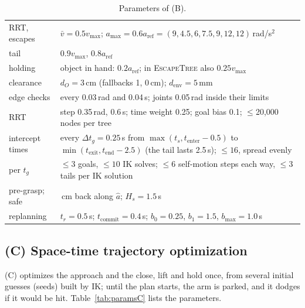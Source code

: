 \documentclass[conference]{IEEEtran}
\begin{document}
\begin{table}[!t]
  \centering
  \caption{Parameters of (B).}
  \label{tab:paramsB}
  \footnotesize\setlength{\tabcolsep}{3pt}
  \begin{tabular}{@{}>{\raggedright\arraybackslash}p{}>{\raggedright\arraybackslash}p{}@{}}
    \toprule
    RRT, escapes & $\bar v=0.5v_{\max}$; $a_{\max}=0.6a_{\text{ref}}=(9,4.5,6,7.5,9,12,12)$\,rad/s$^2$ \\
    tail & $0.9v_{\max}$, $0.8a_{\text{ref}}$ \\
    holding & object in hand: $0.2a_{\text{ref}}$; in \textsc{EscapeTree} also $0.25v_{\max}$ \\
    clearance & $d_O=3$\,cm (fallbacks 1, 0\,cm); $d_{\text{env}}=5$\,mm \\
    edge checks & every 0.03\,rad and 0.04\,s; joints 0.05\,rad inside their limits \\
    RRT & step 0.35\,rad, 0.6\,s; time weight 0.25; goal bias 0.1; $\le$20{,}000 nodes per tree \\
    intercept times & every $\Delta t_g=0.25$\,s from $\max(t_s,t_{\text{enter}}-0.5)$ to
      $\min(t_{\text{exit}},t_{\text{end}}-2.5)$ (the tail lasts 2.5\,s); $\le16$, spread evenly \\
    per $t_g$ & $\le3$ goals, $\le10$ IK solves; $\le6$ self-motion steps each way, $\le3$ tails per IK solution \\
    pre-grasp; safe & 8\,cm back along $\hat a$; $H_s=1.5$\,s \\
    replanning & $t_r=0.5$\,s; $t_{\text{commit}}=0.4$\,s; $b_0=0.25$, $b_1=1.5$, $b_{\max}=1.0$\,s \\
    \bottomrule
  \end{tabular}
\end{table}

\subsection{(C) Space-time trajectory optimization}
\label{app:C}

(C) optimizes the approach and the close, lift and hold once, from several initial guesses (seeds) built by IK; until
the plan starts, the arm is parked, and it dodges if it would be hit. Table~\ref{tab:paramsC} lists the parameters.
\end{document}
